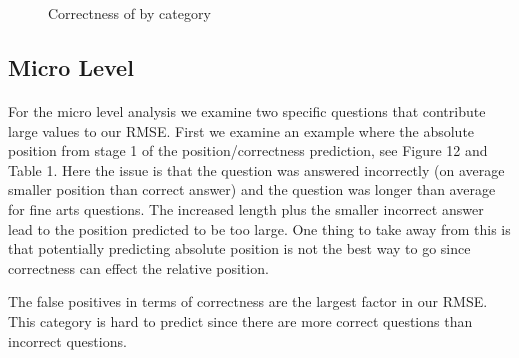 \documentclass[letterpaper]{article}
\begin{document}
\begin{figure}[H]
	\begin{center}
	\end{center}
	\caption{Correctness of by category}
	\label{fig:corr_off}
\end{figure}

\subsection{Micro Level}
\label{sec:micro}
\paragraph{} For the micro level analysis we examine two specific questions that contribute large values to our RMSE.  First we examine an example where the absolute position from stage 1 of the position/correctness prediction, see Figure 12 and Table 1.  Here the issue is that the question was answered incorrectly (on average smaller position than correct answer) and the question was longer than average for fine arts questions.  The increased length plus the smaller incorrect answer lead to the position predicted to be too large.  One thing to take away from this is that potentially predicting absolute position is not the best way to go since correctness can effect the relative position. 

The false positives in terms of correctness are the largest factor in our RMSE.  This category is hard to predict since there are more correct questions than incorrect questions.  
\end{document}
